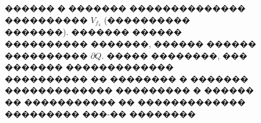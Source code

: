 \documentclass[a4paper]{article}
\begin{document}
\begin{figure}[h!]
  \noindent{}
  \caption{������ � ������� �������������� ���������� $V_{f_4}$ (���������� �������). ������� ������ ���������� �������, ������ ������ ���������� $\partial Q$. ����� ��������, ��� ������� ������������� ���������� �� �������� � ������� ������������� ��������� � ������ �� ����������� �� ������������� ��������� ���-�� ��������}
  \label{nolnol}
\end{figure}
\end{document}
